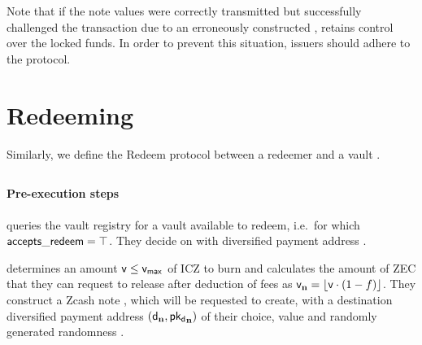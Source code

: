 Note that if the note values were correctly transmitted but \vault successfully challenged the \mint transaction due to an erroneously constructed \cv, \vault retains control over the locked funds.
In order to prevent this situation, issuers should adhere to the protocol.


\section{Redeeming}
\label{sec:redeeming}
Similarly, we define the Redeem protocol between a redeemer \redeemer and a vault \vault.

\subsection{\burnop}
\label{sec:burn}

\paragraph{Pre-execution steps}
\redeemer queries the vault registry for a vault available to redeem, i.e.\ for which $\mathsf{accepts\_redeem} = \top$.
They decide on \vault with diversified payment address \dpa.

\redeemer determines an amount $\mathsf{v} \leq \mathsf{v_{max}}$ of ICZ to burn and calculates the amount of ZEC that they can request \vault to release after deduction of fees as $\valn = \left \lfloor{\val \cdot (1 - f)}\right \rfloor$.
They construct a Zcash note \n, which \vault will be requested to create, with a destination diversified payment address $(\mathsf{d_{\mathbf{n}}}, \mathsf{{pk_d}_{\mathbf{n}}})$ of their choice, value \valn and randomly generated randomness \rcmn.

